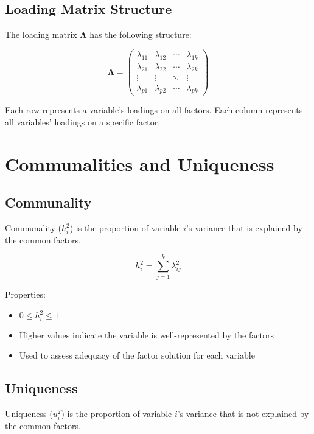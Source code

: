 \documentclass[a4paper]{tufte-book}
\begin{document}
\subsection{Loading Matrix Structure}

The loading matrix $\boldsymbol{\Lambda}$ has the following structure:

$$\boldsymbol{\Lambda} = \begin{pmatrix}
\lambda_{11} & \lambda_{12} & \cdots & \lambda_{1k} \\
\lambda_{21} & \lambda_{22} & \cdots & \lambda_{2k} \\
\vdots & \vdots & \ddots & \vdots \\
\lambda_{p1} & \lambda_{p2} & \cdots & \lambda_{pk}
\end{pmatrix}$$

Each row represents a variable's loadings on all factors. Each column represents all variables' loadings on a specific factor.

\section{Communalities and Uniqueness}

\subsection{Communality}

Communality ($h_i^2$) is the proportion of variable $i$'s variance that is explained by the common factors.

\begin{mathconcept}
$$h_i^2 = \sum_{j=1}^{k} \lambda_{ij}^2$$

Properties:
\begin{itemize}
\item $0 \leq h_i^2 \leq 1$
\item Higher values indicate the variable is well-represented by the factors
\item Used to assess adequacy of the factor solution for each variable
\end{itemize}
\end{mathconcept}

\subsection{Uniqueness}

Uniqueness ($u_i^2$) is the proportion of variable $i$'s variance that is not explained by the common factors.
\end{document}
